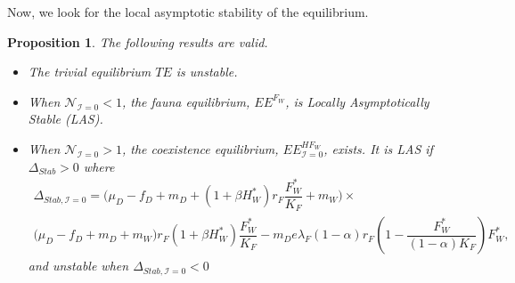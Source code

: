 \documentclass{article}
\newcommand{\lfw}{\lambda_{F}}
\newcommand{\lfw}{\lambda_{F}}
\newcommand{\cI}{\mathcal{I}}
\newtheorem{prop}{Proposition}
\begin{document}
Now, we look for the local asymptotic stability of the equilibrium.

\begin{prop}\label{propLAS, cI=0} The following results are valid.
\begin{itemize}
\item The trivial equilibrium $TE$ is unstable.
\item When $\mathcal{N}_{\cI = 0} < 1$, the fauna equilibrium, $EE^{F_W}$, is Locally Asymptotically Stable (LAS).
\item When $\mathcal{N}_{\cI = 0} > 1$, the coexistence equilibrium, $EE^{HF_W}_{\cI =0}$, exists. It is LAS if $\Delta_{Stab} > 0$ where 
\begin{multline*}
\Delta_{Stab, \cI =0} = \Big(\mu_D - f_D + m_D + (1+\beta H_W^*)r_F \dfrac{F_W^*}{K_F} + m_W\Big) \times \\ \big( \mu_D  -f_D + m_D + m_W \big) r_F(1+ \beta H_W^*) \dfrac{F^*_W}{K_F} - 
m_D e \lfw (1- \alpha) r_F \left(1 - \dfrac{F_W^*}{(1- \alpha)K_F}\right) F_W^*,
\end{multline*}
and unstable when $\Delta_{Stab, \cI =0} < 0$
\end{itemize}
\end{prop}
\end{document}
